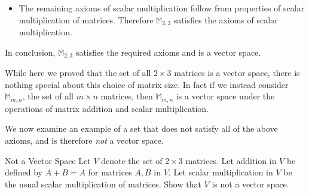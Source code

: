 \begin{solution}
\begin{itemize}
This is a $2 \times 3$ matrix in $\mathbb{M}_{2,3}$ which proves that the set is closed under scalar multiplication. 

\item The remaining axioms of scalar multiplication follow from properties of scalar multiplication of matrices. Therefore $\mathbb{M}_{2,3}$ satisfies the axioms of scalar multiplication. 
\end{itemize}

In conclusion, $\mathbb{M}_{2,3}$ satisfies the required axioms and is a vector space. 
\end{solution}

While here we proved that the set of all $2 \times 3$ matrices is a vector space, there is nothing special about this choice of matrix size. In fact if we instead consider $\mathbb{M}_{m,n}$, the set of all $m \times n$ matrices, then  $\mathbb{M}_{m,n}$ is a vector space under the operations of matrix addition and scalar multiplication. 

We now examine an example of a set that does not satisfy all of the above axioms, and is therefore \textit{not} a vector space. 

\begin{example}{Not a Vector Space}\label{exa:notvectorspace}
Let $V$ denote the set of $2 \times 3$ matrices. Let addition in $V$ be defined by $A + B = A$ for matrices $A,B$ in $V$. Let scalar multiplication in $V$ be the usual scalar multiplication of matrices. Show that $V$ is not a vector space.
\end{example}

